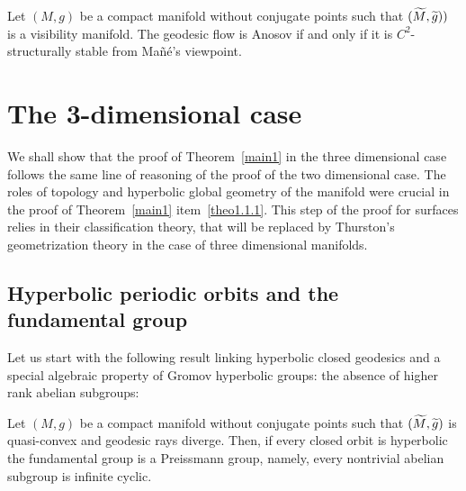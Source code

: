 \documentclass[AHL,Unicode,longabstracts,published]{cedram}
\let\oldtilde\tilde
\renewcommand*{\tilde}[1]{\mathchoice{\widetilde{#1}}{\widetilde{#1}}{\oldtilde{#1}}{\oldtilde{#1}}}
\begin{document}
\begin{theo}\label{stability-visibility}
Let $(M,g)$ be a compact manifold without conjugate points such that $(\tilde{M}, \tilde{g}))$ is a visibility manifold. The geodesic flow is Anosov if and only if it is $C^{2}$-structurally stable from Mañé's viewpoint.
\end{theo}


\section{The 3-dimensional case}\label{sect.7}

We shall show that the proof of Theorem~\ref{main1} in the three dimensional case follows the same line of reasoning of the proof of the two dimensional case. The roles of topology and hyperbolic global geometry of the manifold were crucial in the proof of Theorem~\ref{main1} item~\eqref{theo1.1.1}. This step of the proof for surfaces relies in their classification theory, that will be replaced by Thurston's geometrization theory in the case of three dimensional manifolds.

\subsection{Hyperbolic periodic orbits and the fundamental group}

Let us start with the following result linking hyperbolic closed geodesics and a special algebraic property of Gromov hyperbolic groups: the absence of higher rank abelian subgroups:

\begin{lemm}\label{Preissmann}
Let $(M,g)$ be a compact manifold without conjugate points such that $(\tilde{M}, \tilde{g})$ is quasi-convex and geodesic rays diverge. Then, if every closed orbit is hyperbolic the fundamental group is a Preissmann group, namely, every nontrivial abelian subgroup is infinite cyclic.
\end{lemm}
\end{document}
